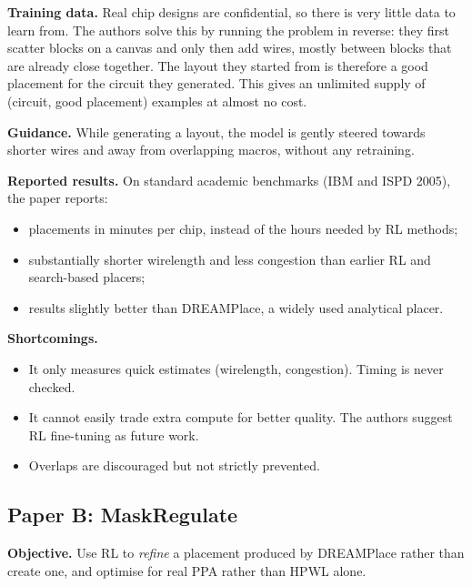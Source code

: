 \documentclass{article}
\begin{document}
\textbf{Training data.} Real chip designs are confidential, so there is very little data to learn
from. The authors solve this by running the problem in reverse: they first scatter blocks on a canvas
and only then add wires, mostly between blocks that are already close together. The layout they
started from is therefore a good placement for the circuit they generated. This gives an unlimited
supply of (circuit, good placement) examples at almost no cost.

\textbf{Guidance.} While generating a layout, the model is gently steered towards shorter wires and
away from overlapping macros, without any retraining.

\textbf{Reported results.} On standard academic benchmarks (IBM and ISPD 2005), the paper reports:
\begin{itemize}
  \item placements in minutes per chip, instead of the hours needed by RL methods;
  \item substantially shorter wirelength and less congestion than earlier RL and search-based placers;
  \item results slightly better than DREAMPlace, a widely used analytical placer.
\end{itemize}

\textbf{Shortcomings.}
\begin{itemize}
  \item It only measures quick estimates (wirelength, congestion). Timing is never checked.
  \item It cannot easily trade extra compute for better quality. The authors suggest RL fine-tuning
  as future work.
  \item Overlaps are discouraged but not strictly prevented.
\end{itemize}

\subsection{Paper B: MaskRegulate \citep{xue2024maskregulate}}
\textbf{Objective.} Use RL to \emph{refine} a placement produced by DREAMPlace rather than create one,
and optimise for real PPA rather than HPWL alone.
\end{document}
